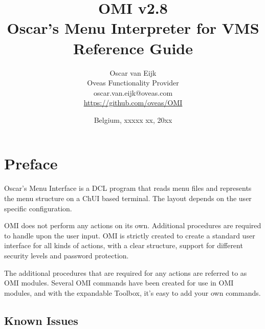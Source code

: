 \documentclass[a4paper]{book}
\newcommand{\vs}{\vspace{3mm}}
\begin{document}
\title{
OMI v2.8\\
Oscar's Menu Interpreter for VMS\\
Reference Guide}

\author{
Oscar van Eijk\\
Oveas Functionality Provider\\
oscar.van.eijk@oveas.com\\
\url{https://github.com/oveas/OMI}}

\date{Belgium, xxxxx xx, 20xx}

\maketitle

\tableofcontents
\listoffigures
\listoftables

\setcounter{page}{1}
\chapter*{Preface}
\label{sec:introductione}

Oscar's Menu Interface is a DCL program that reads menu files and 
represents the menu structure on a ChUI based terminal. The layout depends 
on the user specific configuration.

\vs

OMI does not perform any actions on its own. Additional procedures are 
required to handle upon the user input. OMI is strictly created to create a 
standard user interface for all kinds of actions, with a clear structure, 
support for different security levels and password protection.

\vs

The additional procedures that are required for any actions are referred to 
as OMI modules. Several OMI commands have been created for use in OMI 
modules, and with the expandable Toolbox, it's easy to add your own 
commands.

\section*{Known Issues}
\label{subsec:known}
\end{document}
